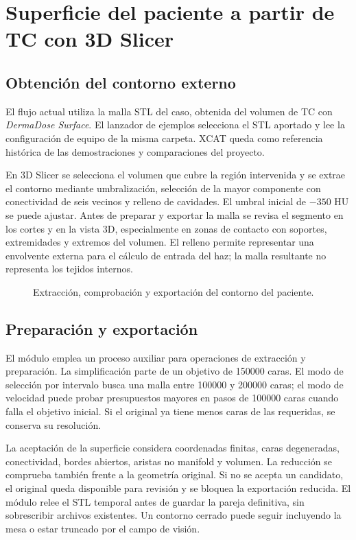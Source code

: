 \chapter{Superficie del paciente a partir de TC con 3D Slicer}

\section{Obtención del contorno externo}
El flujo actual utiliza la malla STL del caso, obtenida del volumen de TC con \textit{DermaDose Surface}. El lanzador de ejemplos selecciona el STL aportado y lee la configuración de equipo de la misma carpeta. XCAT queda como referencia histórica de las demostraciones y comparaciones del proyecto.

En 3D Slicer se selecciona el volumen que cubre la región intervenida y se extrae el contorno mediante umbralización, selección de la mayor componente con conectividad de seis vecinos y relleno de cavidades. El umbral inicial de $-350$ HU se puede ajustar. Antes de preparar y exportar la malla se revisa el segmento en los cortes y en la vista 3D, especialmente en zonas de contacto con soportes, extremidades y extremos del volumen. El relleno permite representar una envolvente externa para el cálculo de entrada del haz; la malla resultante no representa los tejidos internos.

\begin{figure}[htbp]
\centering

\caption{Extracción, comprobación y exportación del contorno del paciente.}
\end{figure}

\section{Preparación y exportación}
El módulo emplea un proceso auxiliar  para operaciones de extracción y preparación. La simplificación parte de un objetivo de \num{150000} caras. El modo de selección por intervalo busca una malla entre \num{100000} y \num{200000} caras; el modo de velocidad puede probar presupuestos mayores en pasos de \num{100000} caras cuando falla el objetivo inicial. Si el original ya tiene menos caras de las requeridas, se conserva su resolución.

La aceptación de la superficie considera coordenadas finitas, caras degeneradas, conectividad, bordes abiertos, aristas no manifold y volumen. La reducción se comprueba también frente a la geometría original. Si no se acepta un candidato, el original queda disponible para revisión y se bloquea la exportación reducida. El módulo relee el STL temporal antes de guardar la pareja definitiva, sin sobrescribir archivos existentes. Un contorno cerrado puede seguir incluyendo la mesa o estar truncado por el campo de visión.

